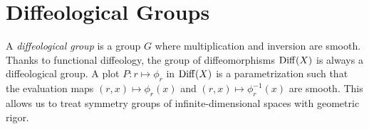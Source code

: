 \documentclass[10pt,reqno,letterpaper,twoside]{amsbook}
\begin{document}
  \section{Diffeological Groups}
  \label{sec:Diffeological Groups}
  
  A \emph{diffeological group} is a group $G$ where multiplication and inversion are smooth.
  Thanks to functional diffeology,
  the group of diffeomorphisms $\operatorname{Diff}(X)$ is always a diffeological group.
  A plot $P:r \mapsto \phi_r$ in $\operatorname{Diff}(X)$ is a parametrization such that the evaluation maps $(r,x) \mapsto \phi_r(x)$ and $(r,x) \mapsto \phi_r^{-1}(x)$ are smooth.
  This allows us to treat symmetry groups of infinite-dimensional spaces with geometric rigor.
  
\end{document}
